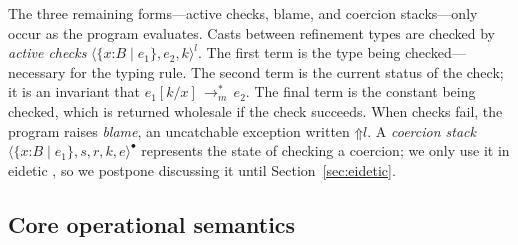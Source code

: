 \documentclass[9pt]{extarticle}
\newcommand{\ottnt}[1]{\mathit{#1}}
\begin{document}
The three remaining forms---active checks, blame, and coercion
stacks---only occur as the program evaluates.
Casts between refinement types are checked by \textit{active checks}
$ \langle   \{ \mathit{x} \mathord{:} \ottnt{B} \mathrel{\mid} \ottnt{e_{{\mathrm{1}}}} \}  ,  \ottnt{e_{{\mathrm{2}}}} ,  \ottnt{k}  \rangle^{ \ottnt{l} } $. The first term is the type being
checked---necessary for the typing rule. The second term is the
current status of the check; it is an invariant that $ \ottnt{e_{{\mathrm{1}}}}  [  \ottnt{k} / \mathit{x}  ]  \,  \longrightarrow ^{*}_{ \ottnt{m} }  \, \ottnt{e_{{\mathrm{2}}}}$. The final term is the constant being checked, which is
returned wholesale if the check succeeds.
When checks fail, the program raises \textit{blame}, an uncatchable
exception written $ \mathord{\Uparrow}  \ottnt{l} $.
A \textit{coercion stack} $ \langle   \{ \mathit{x} \mathord{:} \ottnt{B} \mathrel{\mid} \ottnt{e_{{\mathrm{1}}}} \}  ,  \ottnt{s} ,  \ottnt{r} ,  \ottnt{k} ,  \ottnt{e}  \rangle^{\bullet} $ represents the
state of checking a coercion; we only use it in eidetic \lambdah, so
we postpone discussing it until Section~\ref{sec:eidetic}.

\subsection{Core operational semantics}
\label{sec:opsem}

\end{document}
